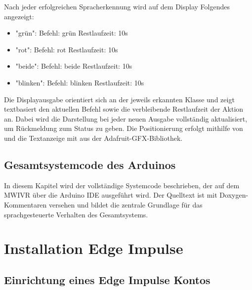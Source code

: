 \bigskip

Nach jeder erfolgreichen Spracherkennung wird auf dem Display Folgendes angezeigt:

\begin{itemize}
    \item "grün": Befehl: grün Restlaufzeit: 10s
    
    \item "rot": Befehl: rot Restlaufzeit: 10s
    
    \item "beide": Befehl: beide Restlaufzeit: 10s
    
    \item "blinken": Befehl: blinken Restlaufzeit: 10s
\end{itemize}

Die Displayausgabe orientiert sich an der jeweils erkannten Klasse und zeigt textbasiert den aktuellen Befehl sowie die verbleibende Restlaufzeit der Aktion an. Dabei wird die Darstellung bei jeder neuen Ausgabe vollständig aktualisiert, um Rückmeldung zum Status zu geben. Die Positionierung erfolgt mithilfe von  und die Textanzeige mit  aus der Adafruit-GFX-Bibliothek.


\section{Gesamtsystemcode des Arduinos} \label{sec:Gesamtsystemcode}

In diesem Kapitel wird der vollständige Systemcode beschrieben, der auf dem MWIVR über die Arduino IDE ausgeführt wird. Der Quelltext ist mit Doxygen-Kommentaren versehen und bildet die zentrale Grundlage für das sprachgesteuerte Verhalten des Gesamtsystems.

{
    \label{lst:Gesamtsystemcode-MWIVR}
}



\chapter{Installation Edge Impulse} \label{sec:Installation}

\section{Einrichtung eines Edge Impulse Kontos}

